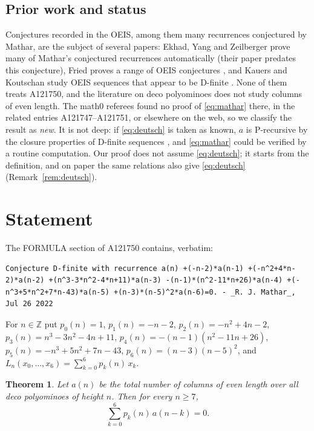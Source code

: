 \documentclass[11pt]{amsart}
\theoremstyle{plain}
\newtheorem{theorem}{Theorem}
\theoremstyle{definition}
\newcommand{\Z}{\mathbb{Z}}
\begin{document}
\subsection*{Prior work and status}
Conjectures recorded in the OEIS, among them many recurrences conjectured by Mathar, are the subject of several papers: Ekhad, Yang and Zeilberger prove many of Mathar's conjectured recurrences automatically \cite{EYZ} (their paper predates this conjecture), Fried proves a range of OEIS conjectures \cite{Fr24,Fr26}, and Kauers and Koutschan study OEIS sequences that appear to be D-finite \cite{KK}. None of them treats A121750, and the literature on deco polyominoes \cite{BDP,BBD,DPP} does not study columns of even length. The math0 referees found no proof of \eqref{eq:mathar} there, in the related entries A121747--A121751, or elsewhere on the web, so we classify the result as \emph{new}. It is not deep: if \eqref{eq:deutsch} is taken as known, $a$ is P-recursive by the closure properties of D-finite sequences \cite{Stanley}, and \eqref{eq:mathar} could be verified by a routine computation. Our proof does not assume \eqref{eq:deutsch}; it starts from the definition, and on paper the same relations also give \eqref{eq:deutsch} (Remark~\ref{rem:deutsch}).

\section{Statement}\label{sec:statement}

The FORMULA section of A121750 \cite{A121750} contains, verbatim:
\begin{lstlisting}[language={},basicstyle=\ttfamily\footnotesize]
Conjecture D-finite with recurrence a(n) +(-n-2)*a(n-1) +(-n^2+4*n-2)*a(n-2) +(n^3-3*n^2-4*n+11)*a(n-3) -(n-1)*(n^2-11*n+26)*a(n-4) +(-n^3+5*n^2+7*n-43)*a(n-5) +(n-3)*(n-5)^2*a(n-6)=0. - _R. J. Mathar_, Jul 26 2022
\end{lstlisting}
For $n\in\Z$ put $p_0(n)=1$, $p_1(n)=-n-2$, $p_2(n)=-n^2+4n-2$, $p_3(n)=n^3-3n^2-4n+11$, $p_4(n)=-(n-1)(n^2-11n+26)$, $p_5(n)=-n^3+5n^2+7n-43$, $p_6(n)=(n-3)(n-5)^2$, and $L_n(x_0,\dots,x_6)=\sum_{k=0}^{6}p_k(n)\,x_k$.

\begin{theorem}\label{thm:main}
Let $a(n)$ be the total number of columns of even length over all deco polyominoes of height $n$. Then for every $n\ge7$,
\begin{equation}\label{eq:mathar}
  \sum_{k=0}^{6}p_k(n)\,a(n-k)=0 .
\end{equation}
\end{theorem}
\end{document}
